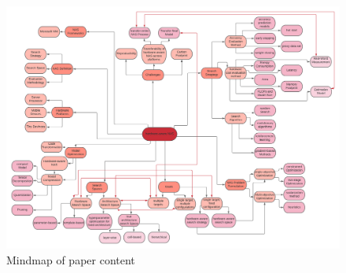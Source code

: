 \documentclass[conference]{IEEEtran}
\begin{document}
\begin{figure}[htbp]
\includegraphics[width=\paperwidth, angle =90]{harware-awareNAS.png}
\caption{Mindmap of paper content}
\label{fig:Mindmap}
\end{figure} 
\end{document}
